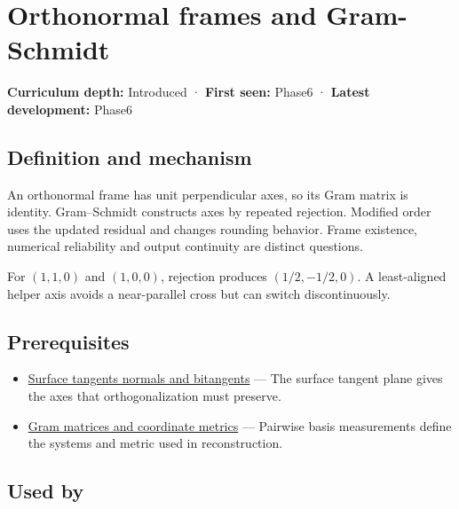 \hypertarget{appendix-c39f1ed34271}{}\label{referencestart:appendix-c39f1ed34271}
\section{Orthonormal frames and Gram-Schmidt}\label{appendix-c39f1ed34271-orthonormal-frames-and-gram-schmidt}

\textbf{Curriculum depth:} Introduced · \textbf{First seen:} Phase6 · \textbf{Latest development:} Phase6

\begin{allmightroledefinition}

\subsection{Definition and mechanism}\label{appendix-c39f1ed34271-definition-and-mechanism}

An orthonormal frame has unit perpendicular axes, so its Gram matrix is identity. Gram--Schmidt constructs axes by repeated rejection. Modified order uses the updated residual and changes rounding behavior. Frame existence, numerical reliability and output continuity are distinct questions.

\end{allmightroledefinition}

For \((1,1,0)\) and \((1,0,0)\), rejection produces \((1/2,-1/2,0)\). A least-aligned helper axis avoids a near-parallel cross but can switch discontinuously.

\subsection{Prerequisites}\label{appendix-c39f1ed34271-prerequisites}

\begin{itemize}
\tightlist
\item
  \hyperref[appendix-e31893dec985]{Surface tangents normals and bitangents} --- The surface tangent plane gives the axes that orthogonalization must preserve.
\item
  \hyperref[appendix-3b863809f82a]{Gram matrices and coordinate metrics} --- Pairwise basis measurements define the systems and metric used in reconstruction.
\end{itemize}

\subsection{Used by}\label{appendix-c39f1ed34271-used-by}

